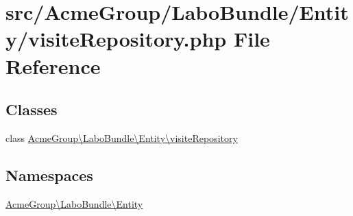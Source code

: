 \hypertarget{visite_repository_8php}{\section{src/\+Acme\+Group/\+Labo\+Bundle/\+Entity/visite\+Repository.php File Reference}
\label{visite_repository_8php}
}
\subsection*{Classes}
\begin{DoxyCompactItemize}
\item 
class \hyperlink{class_acme_group_1_1_labo_bundle_1_1_entity_1_1visite_repository}{Acme\+Group\textbackslash{}\+Labo\+Bundle\textbackslash{}\+Entity\textbackslash{}visite\+Repository}
\end{DoxyCompactItemize}
\subsection*{Namespaces}
\begin{DoxyCompactItemize}
\item 
 \hyperlink{namespace_acme_group_1_1_labo_bundle_1_1_entity}{Acme\+Group\textbackslash{}\+Labo\+Bundle\textbackslash{}\+Entity}
\end{DoxyCompactItemize}
